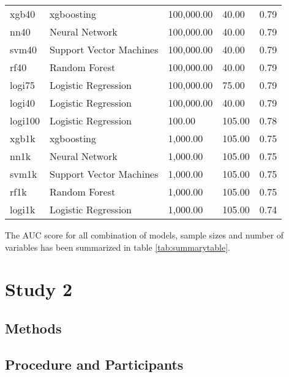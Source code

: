 \documentclass[
  man]{apa7}
\begin{document}
\begin{center}
\begin{ThreePartTable}
\begin{longtable}{lllll}
xgb40 & xgboosting & 100,000.00 & 40.00 & 0.79\\
nn40 & Neural Network & 100,000.00 & 40.00 & 0.79\\
svm40 & Support Vector Machines & 100,000.00 & 40.00 & 0.79\\
rf40 & Random Forest & 100,000.00 & 40.00 & 0.79\\
logi75 & Logistic Regression & 100,000.00 & 75.00 & 0.79\\
logi40 & Logistic Regression & 100,000.00 & 40.00 & 0.79\\
logi100 & Logistic Regression & 100.00 & 105.00 & 0.78\\
xgb1k & xgboosting & 1,000.00 & 105.00 & 0.75\\
nn1k & Neural Network & 1,000.00 & 105.00 & 0.75\\
svm1k & Support Vector Machines & 1,000.00 & 105.00 & 0.75\\
rf1k & Random Forest & 1,000.00 & 105.00 & 0.75\\
logi1k & Logistic Regression & 1,000.00 & 105.00 & 0.74\\
\bottomrule
\end{longtable}

\end{ThreePartTable}
\end{center}

The AUC score for all combination of models, sample sizes and number of variables has been summarized in table \ref{tab:summarytable}.

\hypertarget{study-2}{%
\section{Study 2}\label{study-2}}

\hypertarget{methods-1}{%
\subsection{Methods}\label{methods-1}}

\hypertarget{procedure-and-participants-1}{%
\subsection{Procedure and Participants}\label{procedure-and-participants-1}}
\end{document}
